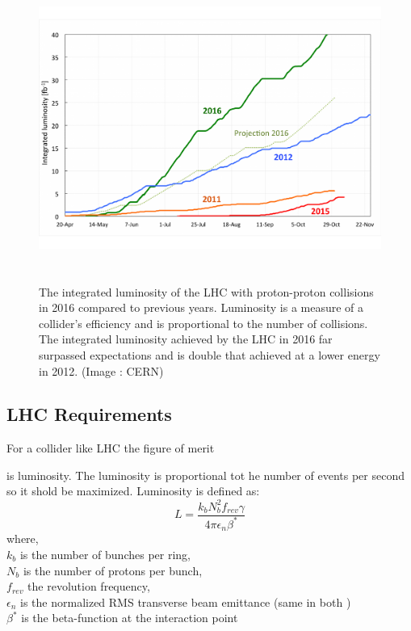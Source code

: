 \begin{figure}[!ht]
  \includegraphics[width=12cm,height=10cm]{figures/lumi-proj-2016-final-v2}
  \caption{The integrated luminosity of the LHC with proton-proton collisions in 2016 compared to previous years. Luminosity is a measure of a collider’s efficiency and is proportional to the number of collisions. The integrated luminosity achieved by the LHC in 2016 far surpassed expectations and is double that achieved at a lower energy in 2012. (Image : CERN)} 
  \label{fig:lumi-proj-2016-final-v2}
\end{figure}

\subsection{LHC Requirements}
For a collider like LHC the figure of merit   

    is luminosity. The luminosity is proportional tot he number of events per second so it shold be maximized. Luminosity is defined as:
\begin{equation}
    L = \frac{k_bN_b^2f_{rev}\gamma}{4 \pi \epsilon_n \beta^*}
\end{equation}
where,\\
\hspace{2cm}$k_b$ is the number of bunches per ring,\\
\hspace{2cm}$N_b$ is the number of protons per bunch,\\
\hspace{2cm}$f_{rev}$ the revolution frequency,\\
\hspace{2cm}$\epsilon_n$ is the normalized RMS transverse beam emittance (same in both )\\
\hspace{2cm}$\beta^*$ is the beta-function at the interaction point\\

